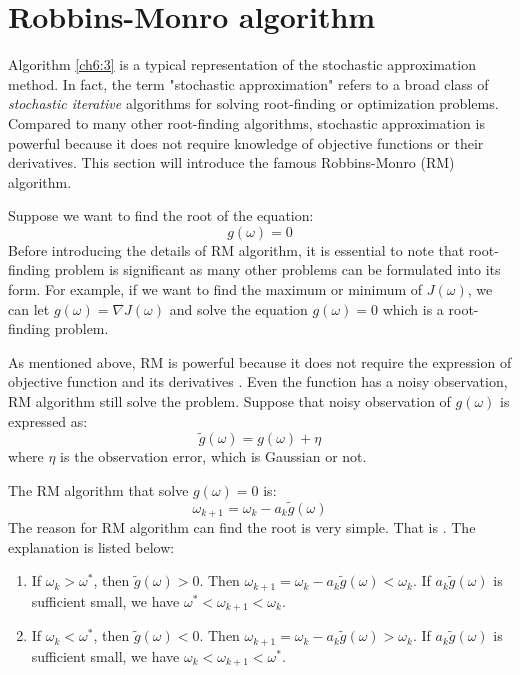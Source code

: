 \section{Robbins-Monro algorithm}

  Algorithm \ref{ch6:3} is a typical representation of the stochastic approximation method. In fact, the term "stochastic
  approximation" refers to a broad class of \emph{stochastic iterative} algorithms for solving root-finding or
  optimization problems. Compared to many other root-finding algorithms, stochastic approximation is powerful because it
  does not require knowledge of objective functions or their derivatives. This section will introduce the famous
  Robbins-Monro (RM) algorithm. \par

  Suppose we want to find the root of the equation:
  \begin{equation*}
    g(\omega) = 0
  \end{equation*}
  Before introducing the details of RM algorithm, it is essential to note that root-finding problem is significant as many
  other problems can be formulated into its form. For example, if we want to find the maximum or minimum of $J(\omega)$,
  we can let $g(\omega) = \nabla J(\omega)$ and solve the equation $g(\omega)=0$ which is a root-finding problem. \par As
  mentioned above, RM is powerful because it does not require the expression of objective function and its derivatives
  . Even the function
  has a noisy observation, RM algorithm still solve the problem. Suppose that noisy observation of $g(\omega)$ is
  expressed as:
  \begin{equation*}
    \tilde{g}(\omega) = g(\omega) + \eta
  \end{equation*}
  where $\eta$ is the observation error, which is Gaussian or not. \par The RM algorithm that solve $g(\omega)=0$ is:
  \begin{equation}
    \label{rm_algorithm}
    \omega_{k+1}=\omega_{k}-a_{k}\tilde{g}(\omega)
  \end{equation}
  The reason for RM algorithm can find the root is very simple. That is {}. The explanation is listed below:
  \begin{enumerate}

    \item
          If $\omega_{k}>\omega^{*}$, then $\tilde{g}(\omega)>0$. Then
          $\omega_{k+1}=\omega_{k}-a_{k}\tilde{g}(\omega)<\omega_{k}$. If $a_{k}\tilde{g}(\omega)$ is sufficient small, we have
          $\omega^{*}<\omega_{k+1}<\omega_{k}$.
    \item
          If $\omega_{k}<\omega^{*}$, then $\tilde{g}(\omega)<0$. Then
          $\omega_{k+1}=\omega_{k}-a_{k}\tilde{g}(\omega)>\omega_{k}$. If $a_{k}\tilde{g}(\omega)$ is sufficient small, we have
          $\omega_{k}<\omega_{k+1}<\omega^{*}$.

  \end{enumerate}

